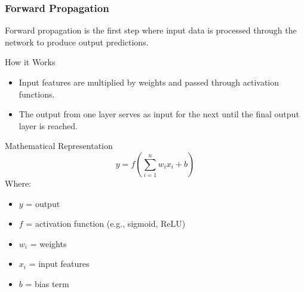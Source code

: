 \documentclass[aspectratio=169]{beamer}
\begin{document}
\begin{frame}[fragile]
    \frametitle{Forward Propagation}
    Forward propagation is the first step where input data is processed through the network to produce output predictions.
    
    \begin{block}{How it Works}
        \begin{itemize}
            \item Input features are multiplied by weights and passed through activation functions.
            \item The output from one layer serves as input for the next until the final output layer is reached.
        \end{itemize}
    \end{block}
    
    \begin{block}{Mathematical Representation}
        \begin{equation}
            y = f\left(\sum_{i=1}^{n} w_i x_i + b\right)
        \end{equation}
        Where:
        \begin{itemize}
            \item $y$ = output
            \item $f$ = activation function (e.g., sigmoid, ReLU)
            \item $w_i$ = weights
            \item $x_i$ = input features
            \item $b$ = bias term
        \end{itemize}
    \end{block}
\end{frame}
\end{document}
